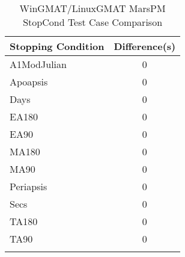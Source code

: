 \begin{table}[htbp!]
\centering
\caption{ WinGMAT/LinuxGMAT MarsPM StopCond Test Case Comparison}
      \begin{tabular}{lc}
      \hline\hline
          Stopping Condition & Difference(s) \\
         \hline
         A1ModJulian & 0 \\
         Apoapsis & 0 \\
         Days & 0 \\
         EA180 & 0 \\
         EA90 & 0 \\
         MA180 & 0 \\
         MA90 & 0 \\
         Periapsis & 0 \\
         Secs & 0 \\
         TA180 & 0 \\
         TA90 & 0 \\
      \hline\hline
      \label{Table: WinGMAT-LinuxGMAT MarsPM StopCond Table} 
\end{tabular}
\end{table}
